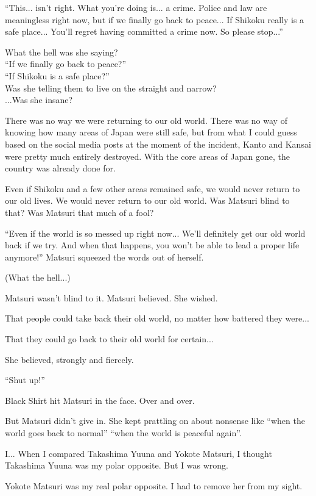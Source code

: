 ``This... isn't right. What you're doing is... a crime. Police and law are meaningless right now, but if we finally go back to peace... If Shikoku really is a safe place... You'll regret having committed a crime now. So please stop...''

What the hell was she saying? \\
``If we finally go back to peace?'' \\
``If Shikoku is a safe place?'' \\
Was she telling them to live on the straight and narrow? \\
...Was she insane?

There was no way we were returning to our old world. There was no way of knowing how many areas of Japan were still safe, but from what I could guess based on the social media posts at the moment of the incident, Kanto and Kansai were pretty much entirely destroyed. With the core areas of Japan gone, the country was already done for.

Even if Shikoku and a few other areas remained safe, we would never return to our old lives. We would never return to our old world.
Was Matsuri blind to that? Was Matsuri that much of a fool?

``Even if the world is so messed up right now... We'll definitely get our old world back if we try. And when that happens, you won't be able to lead a proper life anymore!''
Matsuri squeezed the words out of herself.

(What the hell...)

Matsuri wasn't blind to it. Matsuri believed. She wished.

That people could take back their old world, no matter how battered they were...

That they could go back to their old world for certain...

She believed, strongly and fiercely.

``Shut up!''

Black Shirt hit Matsuri in the face. Over and over.

But Matsuri didn't give in. She kept prattling on about nonsense like ``when the world goes back to normal'' ``when the world is peaceful again''.

I... When I compared Takashima Yuuna and Yokote Matsuri, I thought Takashima Yuuna was my polar opposite. But I was wrong.

Yokote Matsuri was my real polar opposite. I had to remove her from my sight.

